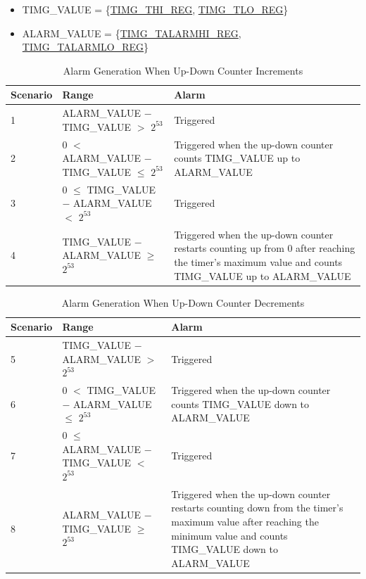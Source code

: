 \documentclass[main\_\_EN.tex]{subfiles}
\begin{document}
\begin{itemize}
    \item TIMG\_VALUE = \{\hyperref[regdesc:TIMGTXHIREG]{TIMG\_THI\_REG}, \hyperref[regdesc:TIMGTXLOREG]{TIMG\_TLO\_REG}\}
    \item ALARM\_VALUE = \{\hyperref[regdesc:TIMGTXALARMHIREG]{TIMG\_TALARMHI\_REG}, \hyperref[regdesc:TIMGTXALARMLOREG]{TIMG\_TALARMLO\_REG}\}
\end{itemize}



\begin{table}[H]
\centering
\caption{Alarm Generation When Up-Down Counter Increments}
\label{tab:timg-alarm-generation-up}

\begin{tabular}{|l|l|m{7cm}|}
\hline
\rowcolor{lightgray}
    \textbf{Scenario} & \textbf{Range} & \textbf{Alarm} \\\hline
     1 & ALARM\_VALUE $-$ TIMG\_VALUE $>$ $2^{53}$ & Triggered \\\hline
     2 & 0 $<$ ALARM\_VALUE $-$ TIMG\_VALUE $\leq$ $2^{53}$ & Triggered when the up-down counter counts TIMG\_VALUE up to ALARM\_VALUE \\\hline
     3 & 0 $\leq$ TIMG\_VALUE $-$ ALARM\_VALUE $<$ $2^{53}$ & Triggered \\\hline
     4 & TIMG\_VALUE $-$ ALARM\_VALUE $\geq$ $2^{53}$ & Triggered when the up-down counter restarts counting up from 0 after reaching the timer's maximum value and counts TIMG\_VALUE up to ALARM\_VALUE \\\hline

\end{tabular}
\end{table}

\begin{table}[H]
\centering
\caption{Alarm Generation When Up-Down Counter Decrements}
\label{tab:timg-alarm-generation-down}

\begin{tabular}{|l|l|m{7cm}|}
\hline
\rowcolor{lightgray}
    \textbf{Scenario} & \textbf{Range} & \textbf{Alarm} \\\hline
     5 & TIMG\_VALUE $-$ ALARM\_VALUE  $>$ $2^{53}$ & Triggered \\\hline
     6 &  0 $<$ TIMG\_VALUE $-$ ALARM\_VALUE $\leq$ $2^{53}$ & Triggered when the up-down counter counts TIMG\_VALUE down to ALARM\_VALUE \\\hline
     7 & 0 $\leq$ ALARM\_VALUE $-$ TIMG\_VALUE $<$ $2^{53}$ & Triggered \\\hline
     8 & ALARM\_VALUE $-$ TIMG\_VALUE $\geq$ $2^{53}$ & Triggered when the up-down counter restarts counting down from the timer's maximum value after reaching the minimum value and counts TIMG\_VALUE down to ALARM\_VALUE \\\hline

\end{tabular}
\end{table}
\end{document}
